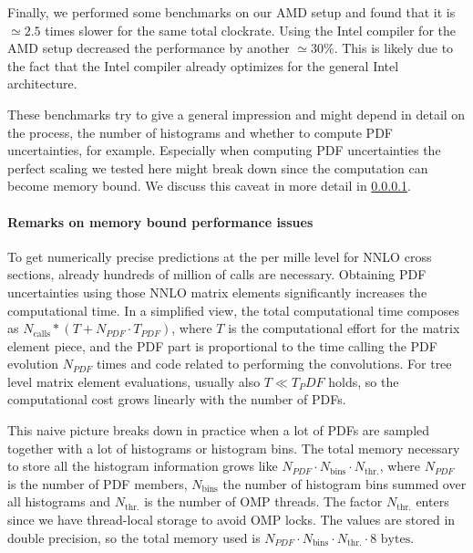 Finally, we performed some benchmarks
on our AMD setup and found that it is $\simeq 2.5$ times slower for the same total clockrate. Using the Intel compiler
for the AMD setup decreased the performance by another $\simeq 30\%$. This is likely due to the fact that the Intel
compiler already optimizes for the general Intel architecture. 

These benchmarks try to give a general impression and might depend in detail on the process, the
number of histograms and whether to compute PDF uncertainties, for example. Especially when computing
PDF uncertainties the perfect scaling we tested here might break down since the computation can become
memory bound. We discuss this caveat in more detail in \ref{subsec:performance}.


\paragraph{Remarks on memory bound performance issues}
\label{subsec:performance}
To get numerically precise predictions at the per mille level for NNLO cross sections,
already hundreds of million of calls are necessary. Obtaining PDF uncertainties using
those NNLO matrix elements significantly increases the computational time. In a simplified view,
the total computational time composes as $N_{\text{calls}}*(T + N_{PDF}\cdot T_{PDF})$, where $T$ is the
computational effort for the matrix element piece, and the PDF part is proportional
to the time calling the PDF evolution $N_{PDF}$ times and code related to performing the convolutions.
For tree level matrix element evaluations, usually also $T \ll T_PDF$ holds, so the computational cost
grows linearly with the number of PDFs.

This naive picture breaks down in practice when a lot of PDFs
are sampled together with a lot of histograms or histogram bins. The total memory necessary
to store all the histogram information grows like $N_{PDF} \cdot N_{\text{bins}} \cdot N_{\text{thr.}}$,
where $N_{PDF}$ is the number of PDF members, $N_{\text{bins}}$ the number of histogram bins
summed over all histograms and $N_{\text{thr.}}$ is the number of OMP threads. The factor $N_{\text{thr.}}$
enters since we have thread-local storage to avoid OMP locks.
The values are stored in double precision, so the total memory used is
$N_{PDF} \cdot N_{\text{bins}} \cdot N_{\text{thr.}} \cdot 8 \text{ bytes}$.

